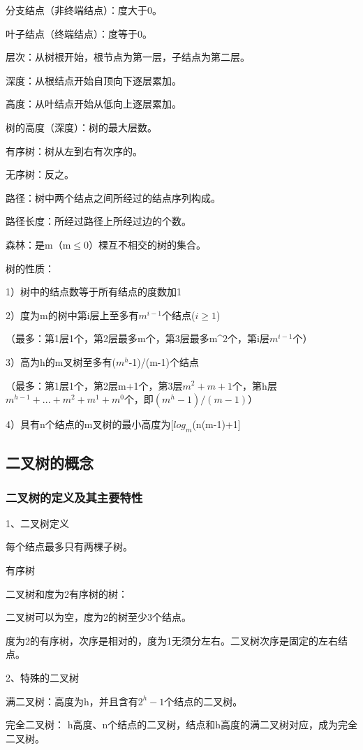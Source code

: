 \documentclass{ctexart}
\begin{document}
分支结点（非终端结点）：度大于0。

叶子结点（终端结点）：度等于0。

层次：从树根开始，根节点为第一层，子结点为第二层。

深度：从根结点开始自顶向下逐层累加。

高度：从叶结点开始从低向上逐层累加。

树的高度（深度）：树的最大层数。

有序树：树从左到右有次序的。

无序树：反之。

路径：树中两个结点之间所经过的结点序列构成。

路径长度：所经过路径上所经过边的个数。

森林：是m（m$\leq$0）棵互不相交的树的集合。

树的性质：

1）树中的结点数等于所有结点的度数加1

2）度为m的树中第i层上至多有$m^{i-1}$个结点($i\geq 1$)

（最多：第1层1个，第2层最多m个，第3层最多m^2个，第i层$m^{i-1}$个）

3）高为h的m叉树至多有($m^h$-1)/(m-1)个结点

（最多：第1层1个，第2层m+1个，第3层$m^2+m+1$个，第h层$m^{h-1}+...+m^2+m^1+m^0$个，即$(m^h-1)/(m-1)$）

4）具有n个结点的m叉树的最小高度为[$log_m$(n(m-1)+1]


\subsection{二叉树的概念}

\subsubsection{二叉树的定义及其主要特性}


1、二叉树定义

每个结点最多只有两棵子树。

有序树

二叉树和度为2有序树的树：

二叉树可以为空，度为2的树至少3个结点。

度为2的有序树，次序是相对的，度为1无须分左右。二叉树次序是固定的左右结点。

2、特殊的二叉树

满二叉树：高度为h，并且含有$2^h-1$个结点的二叉树。

完全二叉树：
h高度、n个结点的二叉树，结点和h高度的满二叉树对应，成为完全二叉树。
\end{document}
